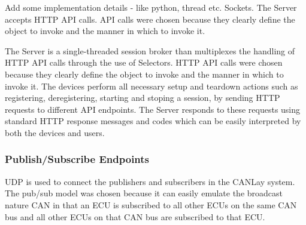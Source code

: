 \documentclass[letterpaper,twocolumn,12pt]{article}
\begin{document}
Add some implementation details - like python, thread etc. Sockets.
The Server accepts HTTP API calls. API calls were chosen because they clearly define the object to invoke and the manner in which to invoke it.

The Server is a single-threaded session broker than multiplexes the handling of HTTP API calls through the use of Selectors. HTTP API calls were chosen because they clearly define the object to invoke and the manner in which to invoke it. The devices perform all necessary setup and teardown actions such as registering, deregistering, starting and stoping a session, by sending HTTP requests to different API endpoints. The Server responds to these requests using standard HTTP response messages and codes which can be easily interpreted by both the devices and users.




\subsubsection{Publish/Subscribe Endpoints}
UDP is used to connect the publishers and subscribers in the CANLay system. 
The pub/sub model was chosen because it can easily emulate the broadcast nature CAN \cite{kaiser_implementing_1999} in that an ECU is subscribed to all other ECUs on the same CAN bus and all other ECUs on that CAN bus are subscribed to that ECU. 
\end{document}
